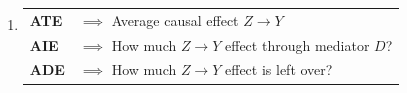 \documentclass[dvipsnames]{beamer} %
\begin{document}
\begin{frame}[noframenumbering]
\begin{enumerate}
\begin{figure}
        \end{figure}
        \item
        \begin{tabular}{ll}
            \textbf{ATE} & $\implies$ Average causal effect $Z \to Y$ \\
            \textbf{AIE} & $\implies$ How much $Z \to Y$ effect through mediator $D$? \\
            \textbf{ADE} & $\implies$ How much $Z \to Y$ effect is left over?
        \end{tabular}
    \end{enumerate}
\end{frame}%
\end{document}
